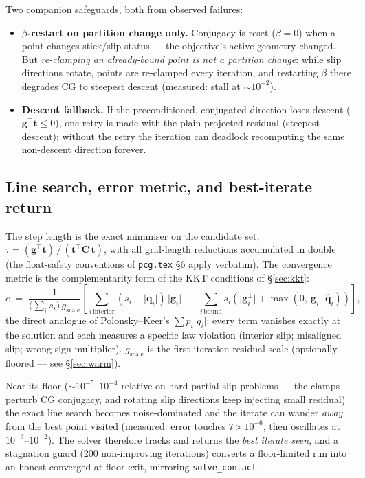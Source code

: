 \documentclass[11pt,a4paper]{article}
\newcommand{\bq}{\mathbf{q}}
\newcommand{\bg}{\mathbf{g}}
\newcommand{\bt}{\mathbf{t}}
\newcommand{\bC}{\mathbf{C}}
\newcommand{\qhat}{\hat{\bq}}
\newcommand{\abs}[1]{\lvert#1\rvert}
\newcommand{\tr}{\top}
\newcommand{\code}[1]{\texttt{#1}}
\begin{document}
Two companion safeguards, both from observed failures:
\begin{itemize}
\item \textbf{$\beta$-restart on partition change only.} Conjugacy is reset
  ($\beta = 0$) when a point changes stick/slip status --- the objective's
  active geometry changed. But \emph{re-clamping an already-bound point is
  not a partition change}: while slip directions rotate, points are
  re-clamped every iteration, and restarting $\beta$ there degrades CG to
  steepest descent (measured: stall at $\sim 10^{-2}$).
\item \textbf{Descent fallback.} If the preconditioned, conjugated direction
  loses descent ($\bg^\tr \bt \le 0$), one retry is made with the plain
  projected residual (steepest descent); without the retry the iteration can
  deadlock recomputing the same non-descent direction forever.
\end{itemize}

\subsection{Line search, error metric, and best-iterate return}
\label{sec:metric}

The step length is the exact minimiser on the candidate set,
$\tau = (\bg^\tr\bt)\,/\,(\bt^\tr \bC\, \bt)$, with all grid-length
reductions accumulated in double (the float-safety conventions of
\code{pcg.tex} \S6 apply verbatim). The convergence metric is the
complementarity form of the KKT conditions of \S\ref{sec:kkt}:
\begin{equation}
  e \;=\; \frac{1}{\bigl(\sum_i s_i\bigr)\, g_{\text{scale}}}
  \left[
  \sum_{i\,\text{interior}} (s_i - \abs{\bq_i})\, \abs{\bg_i}
  \;+\;
  \sum_{i\,\text{bound}} s_i \left( \abs{\bg_i^{\perp}}
      + \max(0,\ \bg_i\cdot\qhat_i) \right)
  \right],
  \label{eq:metric}
\end{equation}
the direct analogue of Polonsky--Keer's $\sum p_i \abs{g_i}$: every term
vanishes exactly at the solution and each measures a specific law violation
(interior slip; misaligned slip; wrong-sign multiplier).
$g_{\text{scale}}$ is the first-iteration residual scale (optionally floored
--- see \S\ref{sec:warm}).

Near its floor ($\sim 10^{-5}$--$10^{-4}$ relative on hard partial-slip
problems --- the clamps perturb CG conjugacy, and rotating slip directions
keep injecting small residual) the exact line search becomes
noise-dominated and the iterate can wander \emph{away} from the best point
visited (measured: error touches $7\times10^{-6}$, then oscillates at
$10^{-3}$--$10^{-2}$). The solver therefore tracks and returns the
\emph{best iterate seen}, and a stagnation guard (200 non-improving
iterations) converts a floor-limited run into an honest converged-at-floor
exit, mirroring \code{solve\_contact}.
\end{document}
